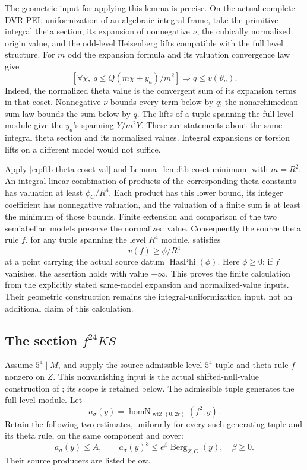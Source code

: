 The geometric input for applying this lemma is precise.  On the actual
complete-DVR PEL uniformization of an algebraic integral frame, take
the primitive integral theta section, its expansion of nonnegative
\(\nu\), the cubically normalized origin value, and the odd-level
Heisenberg lifts compatible with the full level structure.
For \(m\) odd the expansion formula and its valuation convergence law
give
\[
 \left[\forall\chi,\ q\leq
      Q(m\chi+y_a)/m^2\right]
       \Longrightarrow q\leq v(\vartheta_a) .
 \tag{C6}\label{eq:ftb-theta-coset-val}
\]
Indeed, the normalized theta value is the convergent sum of its
expansion terms in that coset.  Nonnegative \(\nu\) bounds every
term below by \(q\); the nonarchimedean sum law bounds the sum below
by \(q\).  The lifts of a tuple spanning the full level module
give the \(y_a\)'s spanning \(Y/m^2Y\).
These are statements about the same integral theta section and its
normalized values.  Integral expansions or torsion lifts on a
different model would not suffice.

Apply \eqref{eq:ftb-theta-coset-val} and
Lemma~\ref{lem:ftb-coset-minimum} with \(m=R^2\).
An integral linear combination of products of the corresponding
theta constants has valuation at least \(\phi_C/R^4\).
Each product has this lower bound, its integer coefficient has
nonnegative valuation, and the valuation of a finite sum is at least
the minimum of those bounds.  Finite extension and comparison of the
two semiabelian models preserve the normalized value.  Consequently
the source theta rule \(f\), for any tuple spanning the level
\(R^4\) module, satisfies
\[
             v(f)\geq\phi/R^4                       \tag{C7}\label{eq:ftb-tau-bound}
\]
at a point carrying the actual source datum \(\operatorname{HasPhi}(\phi)\).
Here \(\phi\geq0\); if \(f\) vanishes, the assertion holds with
value \(+\infty\).
This proves the finite calculation from the explicitly stated
same-model expansion and normalized-value inputs.  Their geometric
construction remains the integral-uniformization input, not an
additional claim of this calculation.

\subsection{The section \(f^{24}KS\)}
Assume \(5^4\mid M\), and supply the source admissible level-\(5^4\)
tuple and theta rule \(f\) nonzero on \(Z\).  This nonvanishing input
is the actual shifted-null-value construction of
; its scope is retained below.
The admissible tuple generates the full level module.
Let
\[
 a_\sigma(y)=
       \operatorname{homN}_{\operatorname{wtZ}(0,2r)}(f^2;y).
\]
Retain the following two estimates, uniformly for every such generating
tuple and its theta rule, on the same component and cover:
\[
 a_\sigma(y)\leq A,\qquad
 a_\sigma(y)^3\leq e^\beta\operatorname{Berg}_{Z,G}(y),
 \quad \beta\geq0.                                 \tag{C8}\label{eq:ftb-carry-analytic}
\]
Their source producers are listed below.


